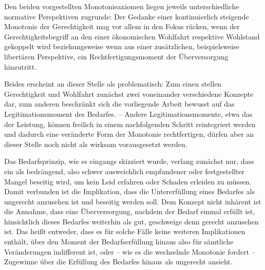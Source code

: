 \documentclass[a4paper]{thesis}
\begin{document}
Den beiden vorgestellten Monotonieaxiomen liegen jeweils unterschiedliche normative Perspektiven zugrunde: Der Gedanke einer kontinuierlich steigende Monotonie der Gerechtigkeit mag vor allem in den Fokus rücken, wenn der Gerechtigkeitsbegriff an den einer ökonomischen Wohlfahrt respektive Wohlstand gekoppelt wird beziehungsweise wenn aus einer zusätzlichen, beispielsweise libertären Perspektive, ein Rechtfertigungsmoment der Überversorgung hinzutritt.

Beides erscheint an dieser Stelle als problematisch: Zum einen stellen Gerechtigkeit und Wohlfahrt zunächst zwei voneinander verschiedene Konzepte dar, zum anderen beschränkt sich die vorliegende Arbeit bewusst auf das Legitimationsmoment des Bedarfes. -- Andere Legitimationsmomente, etwa das der Leistung, können freilich in einem nachfolgenden Schritt reintegriert werden und dadurch eine veränderte Form der Monotonie rechtfertigen, dürfen aber an dieser Stelle noch nicht als wirksam vorausgesetzt werden.

Das Bedarfsprinzip, wie es eingangs skizziert wurde, verlang zunächst nur, dass ein als bedrängend, also schwer ausweichlich empfundener oder festgestellter Mangel beseitig wird, um kein Leid erfahren oder Schaden erleiden zu müssen. Damit verbunden ist die Implikation, dass die Untererfüllung eines Bedarfes als ungerecht anzusehen ist und beseitig werden soll. Dem Konzept nicht inhärent ist die Annahme, dass eine Überversorgung, nachdem der Bedarf einmal erfüllt ist, hinsichtlich dieses Bedarfes weiterhin als gut, geschweige denn gerecht anzusehen ist. Das heißt entweder, dass es für solche Fälle keine weiteren Implikationen enthält, über den Moment der Bedarfserfüllung hinaus also für sämtliche Veränderungen indifferent ist, oder -- wie es die wechselnde Monotonie fordert -- Zugewinne über die Erfüllung des Bedarfes hinaus als ungerecht ansieht.
\end{document}
